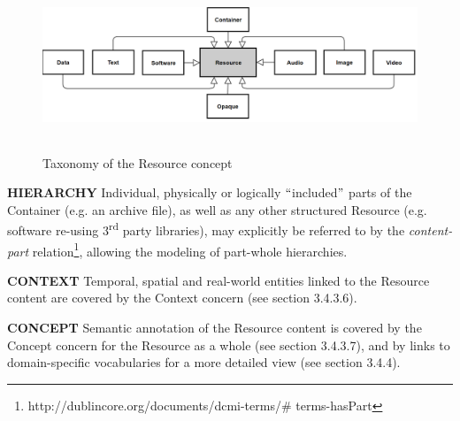 
\begin{figure}[H]
	\begin{Center}
		\includegraphics[width=6.53in,height=2.02in]{./media/image34.png}
		\caption{Taxonomy of the Resource concept}
		\label{fig:Taxonomy_of_the_Resource_concept}
	\end{Center}
\end{figure}





\textbf{HIERARCHY} Individual, physically or logically $``$included$"$  parts of the Container (e.g. an archive file), as well as any other structured Resource (e.g. software re-using 3\textsuperscript{rd} party libraries), may explicitly be referred to by the \textit{content-part} relation\footnote{http://dublincore.org/documents/dcmi-terms/$\#$ terms-hasPart }, allowing the modeling of part-whole hierarchies.

\textbf{CONTEXT} Temporal, spatial and real-world entities linked to the Resource content are covered by the Context concern (see section 3.4.3.6).

\textbf{CONCEPT} Semantic annotation of the Resource content is covered by the Concept concern for the Resource as a whole (see section 3.4.3.7),
and by links to domain-specific vocabularies for a more detailed view (see section 3.4.4).




